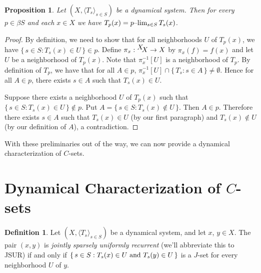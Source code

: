 \documentclass[12pt]{article}
\theoremstyle{plain}
\newtheorem{prop}[thm]{Proposition}
\theoremstyle{definition}
\newtheorem{defn}[thm]{Definition}
\newcommand{\la}{\langle}
\newcommand{\ra}{\rangle}
\newcommand{\ds}{(X, \la T_s \ra_{s\in S})}
\newcommand{\setfunc}[2]{\hbox{${}^{\hbox{$#1$}}\hskip -3 pt #2$}}
\begin{document}
  \begin{prop}
    \label{prop:dsplim}
    Let $\ds$ be a dynamical system.
    Then for every $p \in \beta S$ and each $x \in X$ we have $T_p(x)
    = \hbox{$p$--$\lim_{s \in S} T_s(x)$}$.
  \end{prop}
  \begin{proof}
    By definition, we need to show that for all neighborhoods $U$ of
    $T_p(x)$, we have $\{\, s \in S : T_s(x) \in U \,\} \in p$. 
    Define $\pi_x : \setfunc{X}{X} \to X$ by $\pi_x(f) = f(x)$ and let
    $U$ be a neighborhood of $T_p(x)$.
    Note that $\pi_x^{-1}[U]$ is a neighborhood of $T_p$.
    By definition of $T_p$, we have that for all $A \in p$,
    $\pi_x^{-1}[U] \cap \{\, T_s : s \in A \,\} \ne \emptyset$. 
    Hence for all $A \in p$, there exists $s \in A$ such that $T_s(x)
    \in U$. 

    Suppose there exists a neighborhood $U$ of $T_p(x)$ such that
    $\{\, s \in S : T_s(x) \in U \,\} \not\in p$. 
    Put $A = \{\, s \in S : T_s(x) \not\in U\,\}$.
    Then $A \in p$.
    Therefore there exists $s \in A$ such that $T_s(x) \in U$ (by our
    first paragraph) and $T_s(x) \not\in U$ (by our definition of
    $A$), a contradiction.
  \end{proof}

With these preliminaries out of the way, we can now provide a
dynamical characterization of $C$-sets.

\section{Dynamical Characterization of $C$-sets}
\label{sec:dyncsets}
 \begin{defn}
    \label{defn:JSUR}
    Let $\ds$ be a dynamical system, and let $x$, $y \in X$. 
    The pair $(x,y)$ is \textsl{jointly sparsely uniformly recurrent}
    (we'll abbreviate this to JSUR) if and only if $\{\, s \in S :
    \hbox{$T_s(x) \in U$ and $T_s(y) \in U$} \,\}$ is a $J$-set for every
    neighborhood $U$ of $y$.%
  \end{defn}
\end{document}
